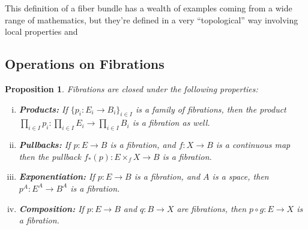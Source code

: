 \documentclass{article}
\newtheorem{proposition}[definition]{Proposition}
\begin{document}
This definition of a fiber bundle has a wealth of examples coming from a wide range of mathematics, but they're defined in a very ``topological'' way involving local properties and 

\subsection{Operations on Fibrations}
\begin{proposition}
  Fibrations are closed under the following properties:
  \begin{enumerate}[(i)]
    \item \textbf{Products:} If $\{p_i : E_i \to B_i\}_{i\in I}$ is a family of fibrations, then the product $\prod_{i\in I} p_i : \prod_{i\in I} E_i \to \prod_{i\in I} B_i$ is a fibration as well.
    \item \textbf{Pullbacks:} If $p: E \to B$ is a fibration, and $f : X \to B$ is a continuous map then the pullback $f_*(p) : E\times_f X \to B$ is a fibration.
    \item \textbf{Exponentiation:} If $p : E \to B$ is a fibration, and $A$ is a space, then $p^A : E^A \to B^A$ is a fibration.
    \item \textbf{Composition:} If $p : E \to B$ and $q : B \to X$ are fibrations, then $p\circ g : E \to X$ is a fibration.
  \end{enumerate}
\end{proposition}
\end{document}
